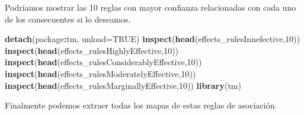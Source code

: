 \documentclass[spanish,]{article}
\newenvironment{Shaded}{\begin{snugshade}}{\end{snugshade}}
\newcommand{\KeywordTok}[1]{\textcolor[rgb]{0.13,0.29,0.53}{\textbf{#1}}}
\newcommand{\DataTypeTok}[1]{\textcolor[rgb]{0.13,0.29,0.53}{#1}}
\newcommand{\DecValTok}[1]{\textcolor[rgb]{0.00,0.00,0.81}{#1}}
\newcommand{\OtherTok}[1]{\textcolor[rgb]{0.56,0.35,0.01}{#1}}
\newcommand{\OperatorTok}[1]{\textcolor[rgb]{0.81,0.36,0.00}{\textbf{#1}}}
\newcommand{\NormalTok}[1]{#1}
\begin{document}
Podríamos mostrar las 10 reglas con mayor confianza relacionadas con
cada uno de los consecuentes si lo deseamos.

\begin{Shaded}
\begin{Highlighting}[]
\KeywordTok{detach}\NormalTok{(package}\OperatorTok{:}\NormalTok{tm, }\DataTypeTok{unload=}\OtherTok{TRUE}\NormalTok{)}
\KeywordTok{inspect}\NormalTok{(}\KeywordTok{head}\NormalTok{(effects_rulesInnefective,}\DecValTok{10}\NormalTok{))}
\KeywordTok{inspect}\NormalTok{(}\KeywordTok{head}\NormalTok{(effects_rulesHighlyEffective,}\DecValTok{10}\NormalTok{))}
\KeywordTok{inspect}\NormalTok{(}\KeywordTok{head}\NormalTok{(effects_rulesConsiderablyEffective,}\DecValTok{10}\NormalTok{))}
\KeywordTok{inspect}\NormalTok{(}\KeywordTok{head}\NormalTok{(effects_rulesModeratelyEffective,}\DecValTok{10}\NormalTok{))}
\KeywordTok{inspect}\NormalTok{(}\KeywordTok{head}\NormalTok{(effects_rulesMarginallyEffective,}\DecValTok{10}\NormalTok{))}
\KeywordTok{library}\NormalTok{(tm)}
\end{Highlighting}
\end{Shaded}

Finalmente podemos extraer todas los mapas de estas reglas de
asociación.
\end{document}
